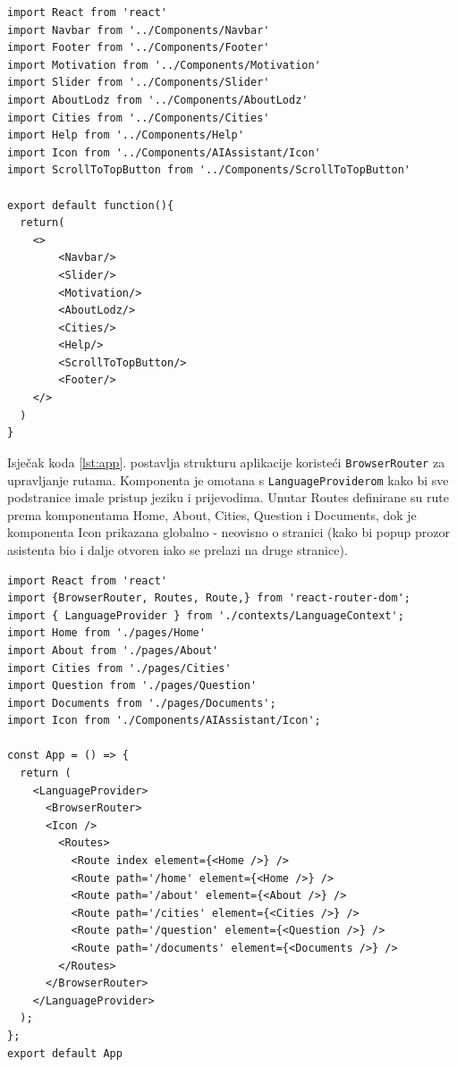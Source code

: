 \documentclass[]{foi}
\begin{document}
\begin{longlisting}
\begin{verbatim}
import React from 'react'
import Navbar from '../Components/Navbar'
import Footer from '../Components/Footer'
import Motivation from '../Components/Motivation'
import Slider from '../Components/Slider'
import AboutLodz from '../Components/AboutLodz'
import Cities from '../Components/Cities'
import Help from '../Components/Help'
import Icon from '../Components/AIAssistant/Icon'
import ScrollToTopButton from '../Components/ScrollToTopButton'

export default function(){
  return(
    <>
        <Navbar/>
        <Slider/>
        <Motivation/>
        <AboutLodz/>
        <Cities/>
        <Help/>
        <ScrollToTopButton/>
        <Footer/>
    </>
  )
}
\end{verbatim}
\caption{Stranica Home}
\label{lst:home}
\end{longlisting}

Isječak koda \ref{lst:app}. postavlja strukturu aplikacije koristeći \verb|BrowserRouter| za upravljanje rutama. Komponenta je omotana s \verb|LanguageProviderom| kako
bi sve podstranice imale pristup jeziku i prijevodima. Unutar Routes definirane su rute prema komponentama Home, About, Cities, Question i Documents,
dok je komponenta Icon prikazana globalno - neovisno o stranici (kako bi popup prozor asistenta bio i dalje otvoren iako se prelazi na druge stranice).

\begin{longlisting}
\begin{verbatim}
import React from 'react'
import {BrowserRouter, Routes, Route,} from 'react-router-dom';
import { LanguageProvider } from './contexts/LanguageContext'; 
import Home from './pages/Home'
import About from './pages/About'
import Cities from './pages/Cities'
import Question from './pages/Question'
import Documents from './pages/Documents';
import Icon from './Components/AIAssistant/Icon'; 

const App = () => {
  return (
    <LanguageProvider> 
      <BrowserRouter>
      <Icon />
        <Routes>
          <Route index element={<Home />} />
          <Route path='/home' element={<Home />} />
          <Route path='/about' element={<About />} />
          <Route path='/cities' element={<Cities />} />
          <Route path='/question' element={<Question />} />
          <Route path='/documents' element={<Documents />} />
        </Routes>
      </BrowserRouter>
    </LanguageProvider>
  );
};
export default App
\end{verbatim}
\caption{App.jsx}
\label{lst:app}
\end{longlisting}
\end{document}
